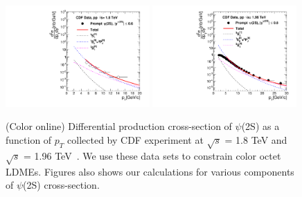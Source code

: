 \documentclass[aps,prc,preprint,superscriptaddress,showpacs,showkeys,amsmath]{revtex4-1}
\begin{document}
\begin{figure}
\includegraphics[width=0.49\textwidth]{Figures/Psi2S/Psi2S_CDF_180TeV.pdf}
\includegraphics[width=0.49\textwidth]{Figures/Psi2S/Psi2S_CDF_196TeV.pdf}
\caption{(Color online) Differential production cross-section of $\psi$(2S) as a function of $p_{T}$ 
collected by CDF experiment at $\sqrt{s}$ = 1.8 TeV and $\sqrt{s}$ = 1.96 TeV~\cite{Acosta:2004yw}. 
We use these data sets to constrain color octet LDMEs. Figures also shows our calculations for various components 
of $\psi$(2S) cross-section.}
\label{Fig:LDMEPsi2SCDF}
\end{figure}
\end{document}
